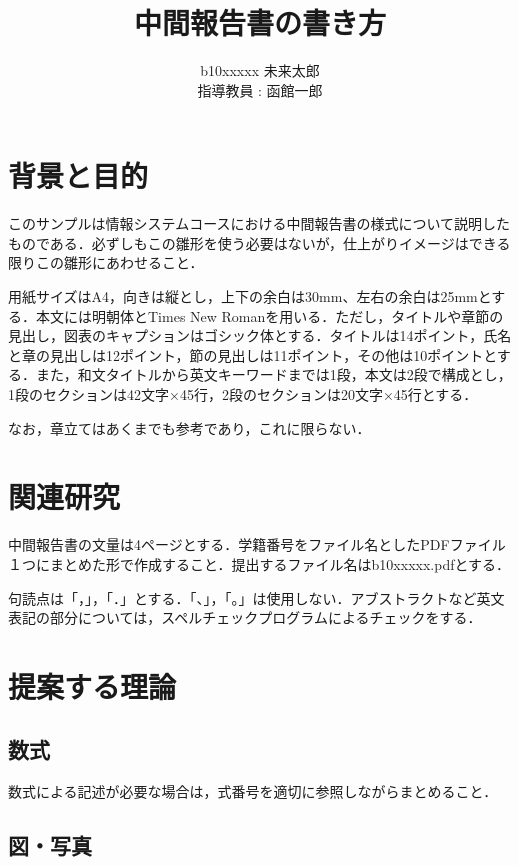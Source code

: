\documentclass[11pt]{jarticle}
\author{%
b10xxxxx 未来太郎\\指導教員 : 函館一郎
}
\title{中間報告書の書き方}
\begin{document}
\maketitle

\section{背景と目的}

このサンプルは情報システムコースにおける中間報告書の様式について説明したものである．必ずしもこの雛形を使う必要はないが，仕上がりイメージはできる限りこの雛形にあわせること．

用紙サイズはA4，向きは縦とし，上下の余白は30mm、左右の余白は25mmとする．本文には明朝体とTimes New Romanを用いる．ただし，タイトルや章節の見出し，図表のキャプションはゴシック体とする．タイトルは14ポイント，氏名と章の見出しは12ポイント，節の見出しは11ポイント，その他は10ポイントとする．また，和文タイトルから英文キーワードまでは1段，本文は2段で構成とし，1段のセクションは42文字×45行，2段のセクションは20文字×45行とする．

なお，章立てはあくまでも参考であり，これに限らない．

\section{関連研究}

中間報告書の文量は4ページとする．学籍番号をファイル名としたPDFファイル１つにまとめた形で作成すること．提出するファイル名はb10xxxxx.pdfとする．

句読点は「，」，「．」とする．「、」，「。」は使用しない．アブストラクトなど英文表記の部分については，スペルチェックプログラムによるチェックをする．

\section{提案する理論}

\subsection{数式}

数式による記述が必要な場合は，式番号を適切に参照しながらまとめること．

\subsection{図・写真}
\end{document}
